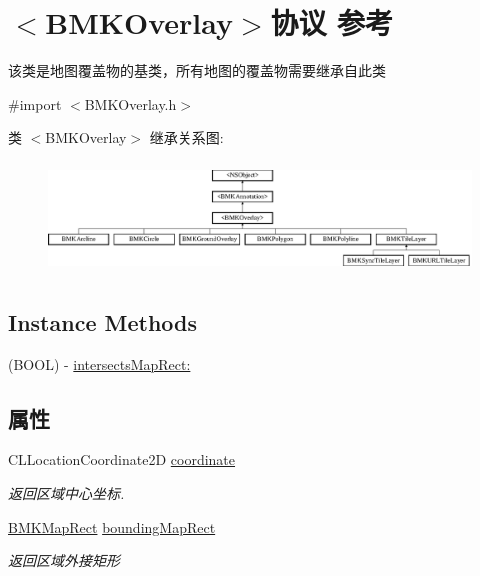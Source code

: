 \hypertarget{protocol_b_m_k_overlay-p}{}\section{$<$B\+M\+K\+Overlay$>$协议 参考}
\label{protocol_b_m_k_overlay-p}


该类是地图覆盖物的基类，所有地图的覆盖物需要继承自此类  




{\ttfamily \#import $<$B\+M\+K\+Overlay.\+h$>$}

类 $<$B\+M\+K\+Overlay$>$ 继承关系图\+:\begin{figure}[H]
\begin{center}
\leavevmode
\includegraphics[height=2.962963cm]{protocol_b_m_k_overlay-p}
\end{center}
\end{figure}
\subsection*{Instance Methods}
\begin{DoxyCompactItemize}
\item 
(B\+O\+O\+L) -\/ \hyperlink{protocol_b_m_k_overlay-p_ad89c522da656c2a977b87bdc1cc4bf21}{intersects\+Map\+Rect\+:}
\end{DoxyCompactItemize}
\subsection*{属性}
\begin{DoxyCompactItemize}
\item 
\hypertarget{protocol_b_m_k_overlay-p_a7a10d9dde65c9611e3b5279179a9d480}{}C\+L\+Location\+Coordinate2\+D \hyperlink{protocol_b_m_k_overlay-p_a7a10d9dde65c9611e3b5279179a9d480}{coordinate}\label{protocol_b_m_k_overlay-p_a7a10d9dde65c9611e3b5279179a9d480}

\begin{DoxyCompactList}\small\item\em 返回区域中心坐标. \end{DoxyCompactList}\item 
\hypertarget{protocol_b_m_k_overlay-p_a77465daa9e52be51cc5aa15591ab74f0}{}\hyperlink{struct_b_m_k_map_rect}{B\+M\+K\+Map\+Rect} \hyperlink{protocol_b_m_k_overlay-p_a77465daa9e52be51cc5aa15591ab74f0}{bounding\+Map\+Rect}\label{protocol_b_m_k_overlay-p_a77465daa9e52be51cc5aa15591ab74f0}

\begin{DoxyCompactList}\small\item\em 返回区域外接矩形 \end{DoxyCompactList}\end{DoxyCompactItemize}



